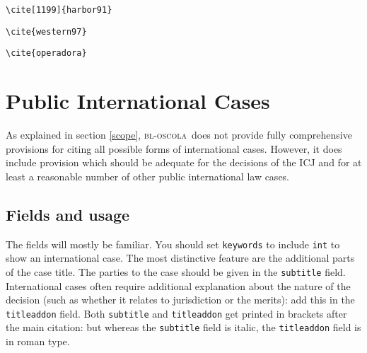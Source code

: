 \documentclass[a5paper,fontsize=9pt,DIV=1]{scrartcl}
\newcommand{\oscola}{\textsc{bl-oscola}}
\newcommand{\egcite}[1]{\texttt{\textbackslash cite#1}}
\begin{document}
\begin{description}
\item[\egcite{[1199]\{harbor91\}}] \cite[1199]{harbor91}
\item[\egcite{\{western97\}}] \cite{western97}
\item[\egcite{\{operadora\}}] {\sloppy\cite{operadora09}}
\end{description}

\section{Public International Cases}

As explained in section \ref{scope}, \oscola\ does not provide
fully comprehensive provisions for citing all possible forms of
international cases. However, it does include provision which should
be adequate for the decisions of the ICJ and for at least a reasonable
number of other public international law cases.

\subsection{Fields and usage}

The fields will mostly be familiar. You should set \texttt{keywords}
to include \texttt{int} to show an international case. The most
distinctive feature are the additional parts of the case title. The
parties to the case should be given in the \texttt{subtitle}
field.
International cases often require additional explanation about
the nature of the decision (such as whether it relates to jurisdiction
or the merits): add this in the \texttt{titleaddon} field. Both
\texttt{subtitle} and \texttt{titleaddon} get printed in brackets
after the main citation: but whereas the \texttt{subtitle} field is
italic, the \texttt{titleaddon} field is in roman type.
\end{document}
